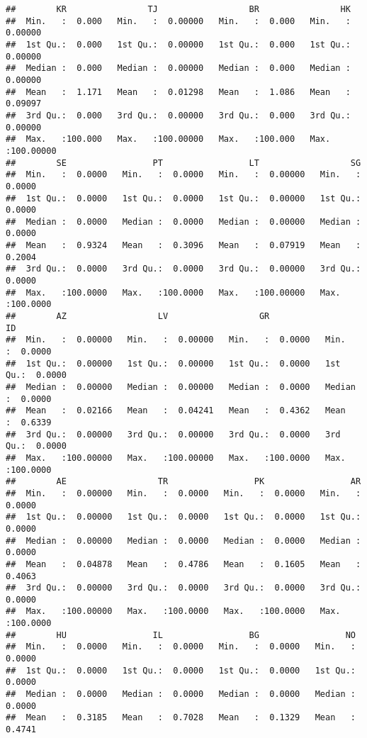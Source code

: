 \documentclass[
]{article}
\begin{document}
\begin{verbatim}
##        KR                TJ                  BR                HK           
##  Min.   :  0.000   Min.   :  0.00000   Min.   :  0.000   Min.   :  0.00000  
##  1st Qu.:  0.000   1st Qu.:  0.00000   1st Qu.:  0.000   1st Qu.:  0.00000  
##  Median :  0.000   Median :  0.00000   Median :  0.000   Median :  0.00000  
##  Mean   :  1.171   Mean   :  0.01298   Mean   :  1.086   Mean   :  0.09097  
##  3rd Qu.:  0.000   3rd Qu.:  0.00000   3rd Qu.:  0.000   3rd Qu.:  0.00000  
##  Max.   :100.000   Max.   :100.00000   Max.   :100.000   Max.   :100.00000  
##        SE                 PT                 LT                  SG          
##  Min.   :  0.0000   Min.   :  0.0000   Min.   :  0.00000   Min.   :  0.0000  
##  1st Qu.:  0.0000   1st Qu.:  0.0000   1st Qu.:  0.00000   1st Qu.:  0.0000  
##  Median :  0.0000   Median :  0.0000   Median :  0.00000   Median :  0.0000  
##  Mean   :  0.9324   Mean   :  0.3096   Mean   :  0.07919   Mean   :  0.2004  
##  3rd Qu.:  0.0000   3rd Qu.:  0.0000   3rd Qu.:  0.00000   3rd Qu.:  0.0000  
##  Max.   :100.0000   Max.   :100.0000   Max.   :100.00000   Max.   :100.0000  
##        AZ                  LV                  GR                 ID          
##  Min.   :  0.00000   Min.   :  0.00000   Min.   :  0.0000   Min.   :  0.0000  
##  1st Qu.:  0.00000   1st Qu.:  0.00000   1st Qu.:  0.0000   1st Qu.:  0.0000  
##  Median :  0.00000   Median :  0.00000   Median :  0.0000   Median :  0.0000  
##  Mean   :  0.02166   Mean   :  0.04241   Mean   :  0.4362   Mean   :  0.6339  
##  3rd Qu.:  0.00000   3rd Qu.:  0.00000   3rd Qu.:  0.0000   3rd Qu.:  0.0000  
##  Max.   :100.00000   Max.   :100.00000   Max.   :100.0000   Max.   :100.0000  
##        AE                  TR                 PK                 AR          
##  Min.   :  0.00000   Min.   :  0.0000   Min.   :  0.0000   Min.   :  0.0000  
##  1st Qu.:  0.00000   1st Qu.:  0.0000   1st Qu.:  0.0000   1st Qu.:  0.0000  
##  Median :  0.00000   Median :  0.0000   Median :  0.0000   Median :  0.0000  
##  Mean   :  0.04878   Mean   :  0.4786   Mean   :  0.1605   Mean   :  0.4063  
##  3rd Qu.:  0.00000   3rd Qu.:  0.0000   3rd Qu.:  0.0000   3rd Qu.:  0.0000  
##  Max.   :100.00000   Max.   :100.0000   Max.   :100.0000   Max.   :100.0000  
##        HU                 IL                 BG                 NO          
##  Min.   :  0.0000   Min.   :  0.0000   Min.   :  0.0000   Min.   :  0.0000  
##  1st Qu.:  0.0000   1st Qu.:  0.0000   1st Qu.:  0.0000   1st Qu.:  0.0000  
##  Median :  0.0000   Median :  0.0000   Median :  0.0000   Median :  0.0000  
##  Mean   :  0.3185   Mean   :  0.7028   Mean   :  0.1329   Mean   :  0.4741  

\end{verbatim}
\end{document}

